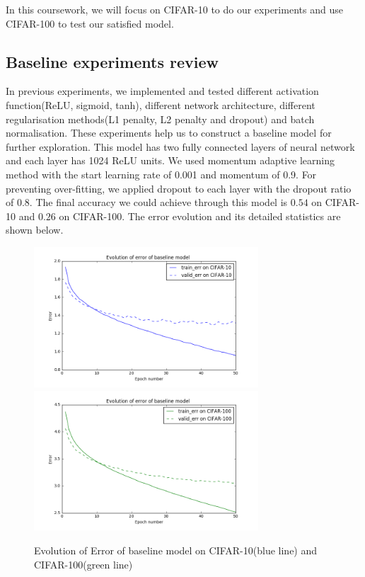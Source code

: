 \documentclass[]{article}
\begin{document}
In this coursework, we will focus on CIFAR-10 to do our experiments and use CIFAR-100 to test our satisfied model.
\subsection{Baseline experiments review}
In previous experiments, we implemented and tested different activation function(ReLU, sigmoid, tanh), different network architecture, different regularisation methods(L1 penalty, L2 penalty and dropout) and batch normalisation. These experiments help us to construct a baseline model for further exploration.
This model has two fully connected layers of neural network and each layer has 1024 ReLU units. We used momentum adaptive learning method with the start learning rate of 0.001 and momentum of 0.9. For preventing over-fitting, we applied dropout to each layer with the dropout ratio of $0.8$. The final accuracy we could achieve through this model is $0.54$ on CIFAR-10 and $0.26$ on CIFAR-100. The error evolution and its detailed statistics are shown below. 

\begin{figure}[ht]
\begin{center}
\includegraphics[width=3.3in]{baseline_error_cifar10}
\includegraphics[width=3.3in]{baseline_error_cifar100}
\caption{Evolution of Error of baseline model on CIFAR-10(blue line) and CIFAR-100(green line) }
\end{center}
\end{figure}
\end{document}
